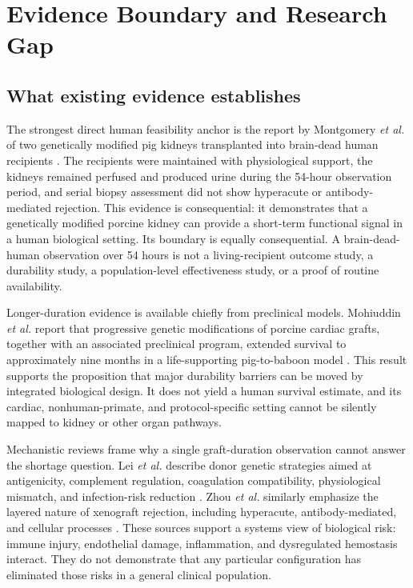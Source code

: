 \documentclass[conference]{IEEEtran}
\begin{document}
\section{Evidence Boundary and Research Gap}

\subsection{What existing evidence establishes}

The strongest direct human feasibility anchor is the report by Montgomery \emph{et al.} of two genetically modified pig kidneys transplanted into brain-dead human recipients \cite{montgomery2022}. The recipients were maintained with physiological support, the kidneys remained perfused and produced urine during the 54-hour observation period, and serial biopsy assessment did not show hyperacute or antibody-mediated rejection. This evidence is consequential: it demonstrates that a genetically modified porcine kidney can provide a short-term functional signal in a human biological setting. Its boundary is equally consequential. A brain-dead-human observation over 54 hours is not a living-recipient outcome study, a durability study, a population-level effectiveness study, or a proof of routine availability.

Longer-duration evidence is available chiefly from preclinical models. Mohiuddin \emph{et al.} report that progressive genetic modifications of porcine cardiac grafts, together with an associated preclinical program, extended survival to approximately nine months in a life-supporting pig-to-baboon model \cite{mohiuddin2022}. This result supports the proposition that major durability barriers can be moved by integrated biological design. It does not yield a human survival estimate, and its cardiac, nonhuman-primate, and protocol-specific setting cannot be silently mapped to kidney or other organ pathways.

Mechanistic reviews frame why a single graft-duration observation cannot answer the shortage question. Lei \emph{et al.} describe donor genetic strategies aimed at antigenicity, complement regulation, coagulation compatibility, physiological mismatch, and infection-risk reduction \cite{lei2022}. Zhou \emph{et al.} similarly emphasize the layered nature of xenograft rejection, including hyperacute, antibody-mediated, and cellular processes \cite{zhou2022}. These sources support a systems view of biological risk: immune injury, endothelial damage, inflammation, and dysregulated hemostasis interact. They do not demonstrate that any particular configuration has eliminated those risks in a general clinical population.
\end{document}
